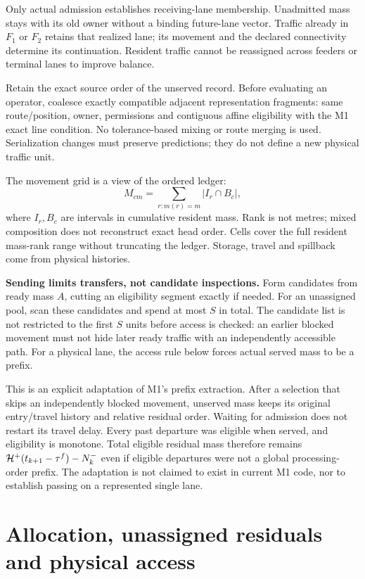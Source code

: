\documentclass[10pt,a4paper]{article}
\begin{document}
Only actual admission establishes receiving-lane membership. Unadmitted
mass stays with its old owner without a binding future-lane vector.
Traffic already in $F_1$ or $F_2$ retains that realized lane; its movement
and the declared connectivity determine its continuation. Resident traffic
cannot be reassigned across feeders or terminal lanes to improve balance.

Retain the exact source order of the unserved record. Before evaluating
an operator, coalesce exactly compatible adjacent representation fragments:
same route/position, owner, permissions and contiguous affine eligibility
with the M1 exact line condition. No tolerance-based mixing or route
merging is used. Serialization changes must preserve predictions; they
do not define a new physical traffic unit.

The movement grid is a view of the ordered ledger:
\begin{equation}
 M_{cm}=\sum_{r:m(r)=m}|I_r\cap B_c|,
 \label{eq:grid}
\end{equation}
where $I_r,B_c$ are intervals in cumulative resident mass. Rank is not
metres; mixed composition does not reconstruct exact head order.
Cells cover the full resident mass-rank range without truncating the
ledger. Storage, travel and spillback come from physical histories.

\textbf{Sending limits transfers, not candidate inspections.}
Form candidates from ready mass $A$, cutting an eligibility segment
exactly if needed. For an unassigned pool, scan these candidates and
spend at most $S$ in total. The candidate list is not restricted to the first $S$ units before access
is checked: an earlier blocked movement must not hide later ready traffic
with an independently accessible path. For a physical lane, the access rule below forces
actual served mass to be a prefix.

This is an explicit adaptation of M1's prefix extraction. After a
selection that skips an independently blocked movement, unserved mass
keeps its original entry/travel history and relative residual order.
Waiting for admission does not restart its travel delay. Every past departure was eligible when served, and eligibility
is monotone. Total eligible residual mass therefore remains
${\cal H}^+(t_{k+1}-\tau^f)-N^-_k$ even if eligible departures were not
a global processing-order prefix. The adaptation is not claimed to exist
in current M1 code, nor to establish passing on a represented single lane.

\section{Allocation, unassigned residuals and physical access}
\end{document}
